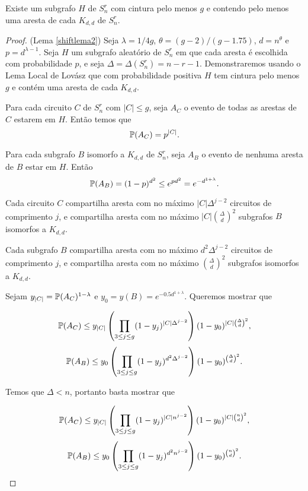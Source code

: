 \begin{lema}\label{shiftlema2}
Existe um subgrafo $H$ de $S_n^r$ com cintura pelo menos $g$ e contendo pelo menos uma aresta de cada $K_{d,d}$ de $S_n^r$.
\end{lema}

\begin{proof}(Lema \ref{shiftlema2})
Seja $\lambda = 1/4g$, $\theta = (g-2)/(g-1.75)$, $d = n^\theta$ e $p = d^{\lambda-1}$. Seja $H$ um subgrafo aleatório de $S_n^r$ em que cada aresta é escolhida com probabilidade $p$, e seja $\Delta = \Delta(S_n^r) = n-r-1$.
Demonstraremos usando o Lema Local de Lovász que com probabilidade positiva $H$ tem cintura pelo menos $g$ e contém uma aresta de cada $K_{d,d}$.

Para cada circuito $C$ de $S_n^r$ com $|C| \leq g$, seja $A_C$ o evento de todas as arestas de $C$ estarem em $H$. Então temos que \[\mathbb{P}(A_C) = p^{|C|}.\]

Para cada subgrafo $B$ isomorfo a $K_{d,d}$ de $S_n^r$, seja $A_B$ o evento de nenhuma aresta de $B$ estar em $H$. Então \[\mathbb{P}(A_B) = (1-p)^{d^2} \leq e^{pd^2} = e^{-d^{1+\lambda}}.\]

Cada circuito $C$ compartilha aresta com no máximo $|C|\Delta^{j-2}$ circuitos de comprimento $j$, e compartilha aresta com no máximo $|C|\binom{\Delta}{d}^2$ subgrafos $B$ isomorfos a $K_{d,d}$.

Cada subgrafo $B$ compartilha aresta com no máximo $d^2\Delta^{j-2}$ circuitos de comprimento $j$, e compartilha aresta com no máximo $\binom{\Delta}{d}^2$ subgrafos isomorfos a $K_{d,d}$.

Sejam $y_{|C|} = \mathbb{P}(A_C)^{1-\lambda}$ e $y_0 = y(B) = e^{-0.5d^{1+\lambda}}$. Queremos mostrar que

\begin{equation*}
\mathbb{P}(A_C) \leq y_{|C|}\left(\prod_{3\leq j\leq g}(1-y_j)^{|C|\Delta^{j-2}}\right)(1-y_0)^{|C|\binom{\Delta}{d}^2},
\end{equation*}
\begin{equation*}
\mathbb{P}(A_B)\leq y_0 \left(\prod_{3\leq j\leq g}(1-y_j)^{d^2\Delta^{j-2}}\right)(1-y_0)^{\binom{\Delta}{d}^2}.
\end{equation*}

Temos que $\Delta < n$, portanto basta mostrar que

\begin{equation}\label{shiftllleq1}
\mathbb{P}(A_C) \leq y_{|C|}\left(\prod_{3\leq j\leq g}(1-y_j)^{|C|n^{j-2}}\right)(1-y_0)^{|C|\binom{n}{d}^2},
\end{equation}
\begin{equation}\label{shiftllleq2}
\mathbb{P}(A_B)\leq y_0 \left(\prod_{3\leq j\leq g}(1-y_j)^{d^2n^{j-2}}\right)(1-y_0)^{\binom{n}{d}^2}.
\end{equation}


\end{proof}
